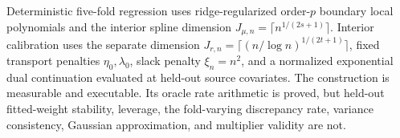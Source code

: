 Deterministic five-fold regression uses ridge-regularized order-\(p\) boundary local polynomials and the interior spline dimension \(J_{\mu,n}=\lceil n^{1/(2s+1)}\rceil\). Interior calibration uses the separate dimension \(J_{r,n}=\lceil(n/\log n)^{1/(2t+1)}\rceil\), fixed transport penalties \(\eta_0,\lambda_0\), slack penalty \(\xi_n=n^2\), and a normalized exponential dual continuation evaluated at held-out source covariates. The construction is measurable and executable. Its oracle rate arithmetic is proved, but held-out fitted-weight stability, leverage, the fold-varying discrepancy rate, variance consistency, Gaussian approximation, and multiplier validity are not.